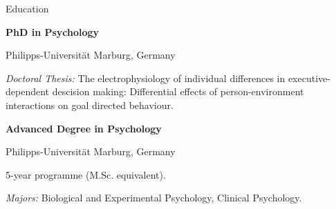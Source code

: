 \begin{rubric}{Education}


\textbf{PhD in Psychology} \par Philipps-Universit\"at Marburg, Germany \par
\textit{Doctoral Thesis:} The electrophysiology of individual differences in executive-dependent descision making: Differential effects of person-environment interactions on goal directed behaviour.

\textbf{Advanced Degree in Psychology} \par Philipps-Universit\"at Marburg, Germany \par \par 
5-year programme (M.Sc. equivalent). \par \par 
\textit{Majors:} Biological and Experimental Psychology, Clinical Psychology.

\end{rubric}
